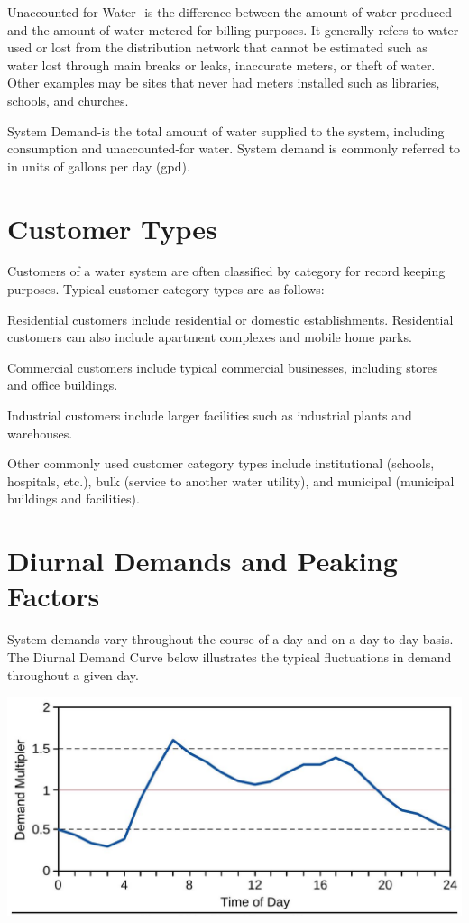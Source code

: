 \documentclass[10pt]{article}
\begin{document}
Unaccounted-for Water- is the difference between the amount of water produced and the amount of water metered for billing purposes. It generally refers to water used or lost from the distribution network that cannot be estimated such as water lost through main breaks or leaks, inaccurate meters, or theft of water. Other examples may be sites that never had meters installed such as libraries, schools, and churches.

System Demand-is the total amount of water supplied to the system, including consumption and unaccounted-for water. System demand is commonly referred to in units of gallons per day (gpd).

\section{Customer Types}
Customers of a water system are often classified by category for record keeping purposes. Typical customer category types are as follows:

Residential customers include residential or domestic establishments. Residential customers can also include apartment complexes and mobile home parks.

Commercial customers include typical commercial businesses, including stores and office buildings.

Industrial customers include larger facilities such as industrial plants and warehouses.

Other commonly used customer category types include institutional (schools, hospitals, etc.), bulk (service to another water utility), and municipal (municipal buildings and facilities).

\section{Diurnal Demands and Peaking Factors}
System demands vary throughout the course of a day and on a day-to-day basis. The Diurnal Demand Curve below illustrates the typical fluctuations in demand throughout a given day.

\includegraphics[max width=\textwidth]{2022_10_30_098bb5f44c5986ff92a9g-34}
\end{document}
